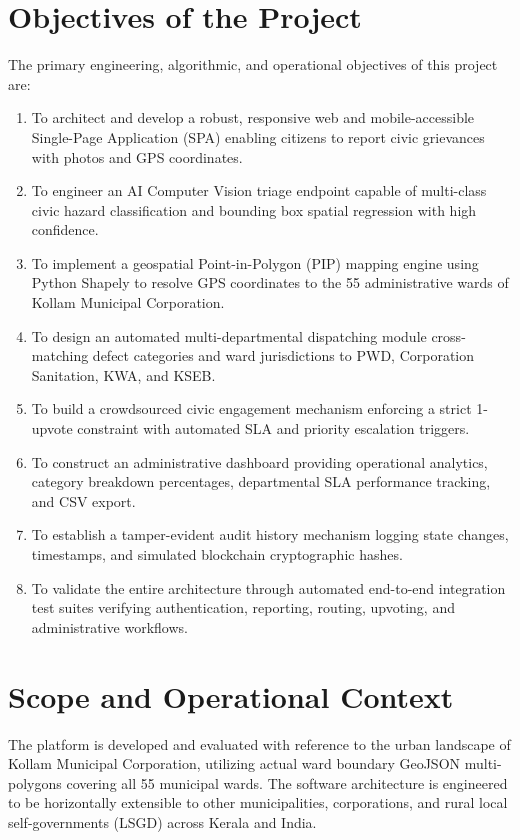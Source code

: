 \documentclass[12pt,a4paper]{report}
\begin{document}
\section{Objectives of the Project}
The primary engineering, algorithmic, and operational objectives of this project are:
\begin{enumerate}
    \item To architect and develop a robust, responsive web and mobile-accessible Single-Page Application (SPA) enabling citizens to report civic grievances with photos and GPS coordinates.
    \item To engineer an AI Computer Vision triage endpoint capable of multi-class civic hazard classification and bounding box spatial regression with high confidence.
    \item To implement a geospatial Point-in-Polygon (PIP) mapping engine using Python Shapely to resolve GPS coordinates to the 55 administrative wards of Kollam Municipal Corporation.
    \item To design an automated multi-departmental dispatching module cross-matching defect categories and ward jurisdictions to PWD, Corporation Sanitation, KWA, and KSEB.
    \item To build a crowdsourced civic engagement mechanism enforcing a strict 1-upvote constraint with automated SLA and priority escalation triggers.
    \item To construct an administrative dashboard providing operational analytics, category breakdown percentages, departmental SLA performance tracking, and CSV export.
    \item To establish a tamper-evident audit history mechanism logging state changes, timestamps, and simulated blockchain cryptographic hashes.
    \item To validate the entire architecture through automated end-to-end integration test suites verifying authentication, reporting, routing, upvoting, and administrative workflows.
\end{enumerate}

\section{Scope and Operational Context}
The platform is developed and evaluated with reference to the urban landscape of Kollam Municipal Corporation, utilizing actual ward boundary GeoJSON multi-polygons covering all 55 municipal wards. The software architecture is engineered to be horizontally extensible to other municipalities, corporations, and rural local self-governments (LSGD) across Kerala and India.
\end{document}
